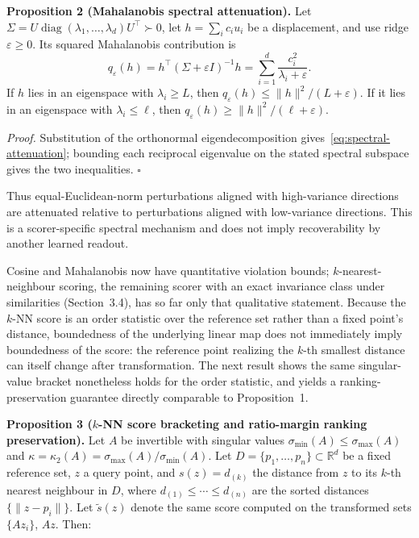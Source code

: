 \documentclass[11pt,a4paper]{article}
\begin{document}
\textbf{Proposition 2 (Mahalanobis spectral attenuation).} Let $\Sigma=U\operatorname{diag}(\lambda_1,\ldots,\lambda_d)U^\top\succ0$, let $h=\sum_i c_i u_i$ be a displacement, and use ridge $\varepsilon\ge0$. Its squared Mahalanobis contribution is
\begin{equation}
q_\varepsilon(h)=h^\top(\Sigma+\varepsilon I)^{-1}h
=\sum_{i=1}^{d}\frac{c_i^2}{\lambda_i+\varepsilon}.
\label{eq:spectral-attenuation}
\end{equation}
If $h$ lies in an eigenspace with $\lambda_i\ge L$, then
$q_\varepsilon(h)\le\|h\|^2/(L+\varepsilon)$. If it lies in an eigenspace with $\lambda_i\le \ell$, then $q_\varepsilon(h)\ge\|h\|^2/(\ell+\varepsilon)$.

\emph{Proof.} Substitution of the orthonormal eigendecomposition gives~\eqref{eq:spectral-attenuation}; bounding each reciprocal eigenvalue on the stated spectral subspace gives the two inequalities. \hfill$\square$

Thus equal-Euclidean-norm perturbations aligned with high-variance directions are attenuated relative to perturbations aligned with low-variance directions. This is a scorer-specific spectral mechanism and does not imply recoverability by another learned readout.

Cosine and Mahalanobis now have quantitative violation bounds; $k$-nearest-neighbour scoring, the remaining scorer with an exact invariance class under similarities (Section~3.4), has so far only that qualitative statement. Because the $k$-NN score is an order statistic over the reference set rather than a fixed point's distance, boundedness of the underlying linear map does not immediately imply boundedness of the score: the reference point realizing the $k$-th smallest distance can itself change after transformation. The next result shows the same singular-value bracket nonetheless holds for the order statistic, and yields a ranking-preservation guarantee directly comparable to Proposition~1.

\textbf{Proposition 3 ($k$-NN score bracketing and ratio-margin ranking preservation).} Let $A$ be invertible with singular values $\sigma_{\min}(A)\le\sigma_{\max}(A)$ and $\kappa=\kappa_2(A)=\sigma_{\max}(A)/\sigma_{\min}(A)$. Let $D=\{p_1,\ldots,p_n\}\subset\mathbb{R}^d$ be a fixed reference set, $z$ a query point, and $s(z)=d_{(k)}$ the distance from $z$ to its $k$-th nearest neighbour in $D$, where $d_{(1)}\le\cdots\le d_{(n)}$ are the sorted distances $\{\|z-p_i\|\}$. Let $\widetilde s(z)$ denote the same score computed on the transformed sets $\{Az_i\}$, $Az$. Then:
\end{document}

